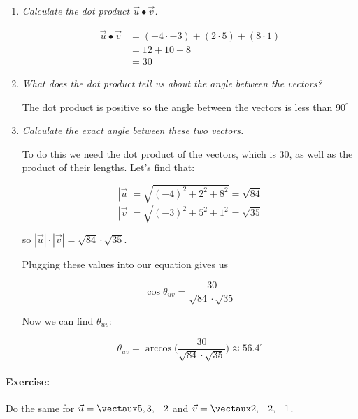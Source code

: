 \documentclass{article}
\begin{document}
\begin{enumerate}
	\item \textit{Calculate the dot product $\vec{u}\bullet\vec{v}$.}

	
	\begin{align*}
	\vec{u}\bullet\vec{v} &= (-4\cdot -3)+(2\cdot 5)+(8\cdot 1)\\
	&= 12+10+8\\
	&=30
	\end{align*}

	\item \textit{What does the dot product tell us about the angle between the vectors?}

	The dot product is positive so the angle between the vectors is less than $90^\circ$
	
	\item \textit{Calculate the exact angle between these two vectors.} 

	To do this we need the dot product of the vectors, which is $30$, as well as the product of their lengths. Let's find that: 

	\[
	|\vec{u}| = \sqrt{(-4)^2+2^2+8^2} = \sqrt{84} 
	\]
	\[
	|\vec{v}| = \sqrt{(-3)^2+5^2+1^2} = \sqrt{35} 
	\]

	so $|\vec{u}|\cdot |\vec{v}| = \sqrt{84}\cdot\sqrt{35}$. 

	Plugging these values into our equation gives us 
	
	\[
	\cos \theta_{uv} = \frac{30}{\sqrt{84}\cdot\sqrt{35}}
	\]

	Now we can find $\theta_{uv}$: 

	\[
	\theta_{uv}=\arccos\Bigg(\frac{30}{\sqrt{84}\cdot\sqrt{35}}\Bigg) \approx 56.4^\circ
	\]
\end{enumerate}




\paragraph{Exercise:} Do the same for $\vec{u}=\vect{5,3,-2}$ and $\vec{v}=\vect{2,-2,-1}$.
\end{document}
